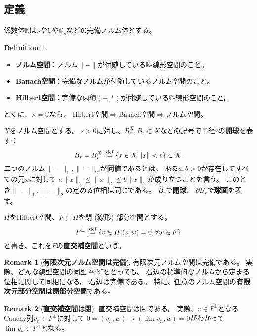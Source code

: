\documentclass[uplatex]{jsarticle}
\theoremstyle{definition}
\newtheorem{defi}[defi]{Definition}
\newtheorem{rem}[rem]{Remark}
\newcommand{\dfn}{:\overset{\mbox{{\scriptsize def}}}{=}}
\newcommand{\dl}{\partial}
\newcommand{\C}{\mathbb{C}}
\newcommand{\K}{\mathbb{K}}
\newcommand{\R}{\mathbb{R}}
\newcommand{\Q}{\mathbb{Q}}
\begin{document}
\subsection{定義}


係数体\(\K\)は\(\R\)や\(\C\)や\(\Q_p\)などの完備ノルム体とする。

\begin{defi}
  \
  \begin{itemize}
    \item \textbf{ノルム空間}：ノルム\(\|-\|\)が付随している\(\K\)-線形空間のこと。
    \item \textbf{Banach空間}：完備なノルムが付随しているノルム空間のこと。
    \item \textbf{Hilbert空間}：完備な内積\((-,*)\)が付随している\(\C\)-線形空間のこと。
  \end{itemize}
  とくに、\(\K=\C\)なら、
  Hilbert空間\(\Rightarrow\)Banach空間\(\Rightarrow\)ノルム空間。

  \(X\)をノルム空間とする。
  \(r>0\)に対し、\(B_r^X,B_r\subset X\)などの記号で半径\(r\)の\textbf{開球}を表す：
  \[
  B_r = B_r^X \dfn \{ x\in X | \|x\| < r \} \subset X.
  \]
  二つのノルム\(\|-\|_1,\|-\|_2\)が\textbf{同値}であるとは、
  ある\(a,b>0\)が存在してすべての元\(x\)に対して
  \(a\|x\|_1 \leq \|x\|_2\leq b\|x\|_1\)が成り立つことを言う。
  このとき\(\|-\|_1,\|-\|_2\)の定める位相は同じである。
  \(\bar{B}_r\)で\textbf{閉球}、
  \(\dl B_r\)で\textbf{球面}を表す。

  \(H\)をHilbert空間、\(F\subset H\)を閉 (線形) 部分空間とする。
  \[
  F^{\bot} \dfn \{ v\in H | (v,w)=0, \forall w\in F\}
  \]
  と書き、これを\(F\)の\textbf{直交補空間}という。
\end{defi}


\begin{rem}[\textbf{有限次元ノルム空間は完備}]
  有限次元ノルム空間は完備である。
  実際、どんな線型空間の同型\(\cong \K^r\)をとっても、
  右辺の標準的なノルムから定まる位相に関して同相になる。
  右辺は完備である。
  特に、任意のノルム空間の\textbf{有限次元部分空間は閉部分空間}である。
\end{rem}


\begin{rem}[\textbf{直交補空間は閉}]
  直交補空間は閉である。
  実際、\(v\in \overline{F^{\bot}}\)となるCauchy列\(v_n\in F^{\bot}\)に対して
  \(0 = (v_n,w) \to (\lim v_n,w) = 0\)がわかって\(\lim v_n\in F^{\bot}\)となる。
\end{rem}
\end{document}
